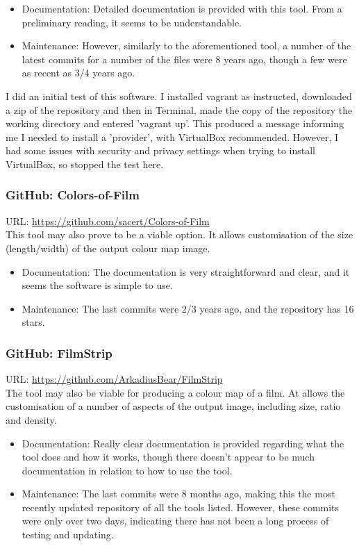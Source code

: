 \documentclass{article}
\begin{document}
\begin{itemize}
    \item Documentation: Detailed documentation is provided with this tool. From a preliminary reading, it seems to be understandable.
    \item Maintenance: However, similarly to the aforementioned tool, a number of the latest commits for a number of the files were 8 years ago, though a few were as recent as 3/4 years ago.
\end{itemize}
I did an initial test of this software. I installed vagrant as instructed, downloaded a zip of the repository and then in Terminal, made the copy of the repository the working directory and entered 'vagrant up'. This produced a message informing me I needed to install a 'provider', with VirtualBox recommended. However, I had some issues with security and privacy settings when trying to install VirtualBox, so stopped the test here.

\subsubsection{GitHub: Colors-of-Film}
URL: \url{https://github.com/sacert/Colors-of-Film}\\
This tool may also prove to be a viable option. It allows customisation of the size (length/width) of the output colour map image.
\begin{itemize}
    \item Documentation: The documentation is very straightforward and clear, and it seems the software is simple to use.
    \item Maintenance: The last commits were 2/3 years ago, and the repository has 16 stars.
\end{itemize}

\subsubsection{GitHub: FilmStrip}
URL: \url{https://github.com/ArkadiusBear/FilmStrip}\\
The tool may also be viable for producing a colour map of a film. At allows the customisation of a number of aspects of the output image, including size, ratio and density.

\begin{itemize}
    \item Documentation: Really clear documentation is provided regarding what the tool does and how it works, though there doesn't appear to be much documentation in relation to how to use the tool.
    \item Maintenance: The last commits were 8 months ago, making this the most recently updated repository of all the tools listed. However, these commits were only over two days, indicating there has not been a long process of testing and updating.
\end{itemize}
 
\end{document}
